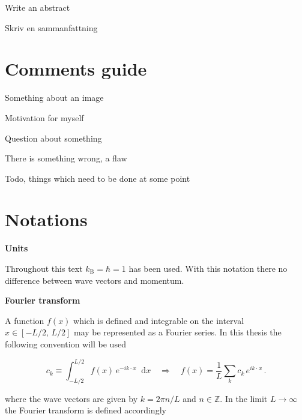\documentclass[12pt]{report}
\title{
	\vspace{-2.5cm}
	\begin{center}
		\texttt{[image: \{"Images/KTH logo/KTH\_CMYK"]}.eps}\\[-1mm]
		\hspace{-3mm} {\tiny {\sf Theoretical Physics}}
	\end{center}
	\vspace{2cm}
	\noindent\rule{16cm}{0.4pt}\\[2ex]
	Diagrammatic Monte Carlo\\
	\noindent\rule{16cm}{0.4pt}\\[3ex]
}
\author{
	Blomquist, Emil \\
	\texttt{emilbl@kth.se} \\[3em]
	Master of Science Thesis \\
	Supervisor: Egor Babaev \\[1em]
}
\date{
    \dateenglish
    \today
}
\newenvironment{abstractpage}
  {\cleardoublepage\vspace*{\fill}\thispagestyle{empty}}
  {\vfill\cleardoublepage}
\renewenvironment{abstract}[1]
  {\bigskip\selectlanguage{#1}%
   \begin{center}\bfseries\abstractname\end{center}}
  {\par\bigskip}
\newcommand*\diff{\mathop{}\!\mathrm{d}}
\newcommand{\image}[1]{{\leavevmode\color{image}#1}}
\newcommand{\motivation}[1]{{\leavevmode\color{motivation}#1}}
\newcommand{\question}[1]{{\leavevmode\color{question}#1}}
\newcommand{\flaw}[1]{{\leavevmode\color{flaw}#1}}
\newcommand{\todo}[1]{{\leavevmode\color{todo}#1}}
\begin{document}
\maketitle
\begin{abstractpage}
\begin{abstract}{english}
\todo{Write an abstract}
\end{abstract}
\begin{abstract}{swedish}
\todo{Skriv en sammanfattning}

\end{abstract}
\end{abstractpage}


\section*{Comments guide}

\image{Something about an image}

\motivation{Motivation for myself}

\question{Question about something}

\flaw{There is something wrong, a flaw}

\todo{Todo, things which need to be done at some point}

\newpage

\section*{Notations}

\textbf{Units}

Throughout this text $ k_\text{B} = \hbar = 1 $ has been used. With this notation there no difference between wave vectors and momentum.

\textbf{Fourier transform}

A function $ f(x) $ which is defined and integrable on the interval $ x \in [-L/2, \, L/2] $ may be represented as a Fourier series. In this thesis the following convention will be used

\begin{equation}
	c_k
	\equiv \int_{-L/2}^{L/2} f(x) \, e^{-i k \cdot x} \diff x
	\quad \Rightarrow \quad
	f(x)
	= \frac{1}{L} \sum_{k} c_k \, e^{i k \cdot x} \,.
\end{equation}

where the wave vectors are given by $ k = 2 \pi n / L $ and $ n \in \mathbb{Z} $. In the limit $ L \rightarrow \infty $ the Fourier transform is defined accordingly
\end{document}

